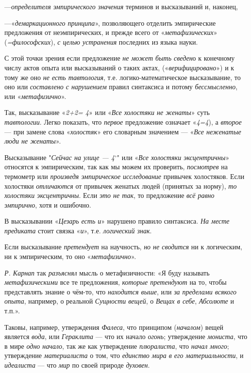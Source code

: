 \documentclass[a4paper,14pt,russian]{extreport}
\begin{document}
---\emph{определителя эмпирического значения} терминов и высказываний и, наконец,

---«\emph{демаркационного принципа}», позволяющего отделить эмпирические предложения от неэмпирических, и прежде всего от «\emph{метафизических}» (\emph{=философских}), \emph{с целью устранения} последних из языка науки.

С этой точки зрения если предложение \emph{не может быть сведен}о к конечному числу актов опыта или высказываний о таких актах, («\emph{верифицировано}») и к тому же оно \emph{не есть тавтология}, т.е. логико-математическое высказывание, то оно или \emph{составлено с нарушением} правил синтаксиса и потому \emph{бессмысленно}, или «\emph{метафизично}».

Так, высказывание «\emph{2+2= 4}» или «\emph{Все холостяки не женаты}» суть \emph{тавтологии}. Легко показать, что \emph{первое} предложение означает «\emph{4=4}), а \emph{второе} --- при замене слова «\emph{холостяк}» его словарным значением --- «\emph{Все неженатые люди не женаты}».

Высказывание "\emph{Сейчас на улице --- 4}$^{\circ}$" или «\emph{Все холостяки эксцентричны}» относятся к эмпирическим, так как мы можем их проверить, \emph{посмотрев} на термометр или \emph{произведя эмпирическое исследование} привычек холостяков. Если холостяки \emph{отличаются} от привычек женатых людей (принятых за норму), \emph{то холостяки эксцентричны}. Если \emph{это не так}, то предложение \emph{всё равно эмпирично}, хотя и ошибочно.

В высказывании «\emph{Цезарь есть и}» нарушено правило синтаксиса. \emph{На месте предиката} стоит связка «\emph{и}», т.е. \emph{логический знак}.

Если высказывание \emph{претендует} на научность, \emph{но не сводится} ни к логическим, ни к эмпирическим, то оно «\emph{метафизично}».

\emph{Р. Карнап} так \emph{разъяснял} мысль о метафизичности: «Я буду называть \emph{метафизическими} все те предложения, \emph{которые претендуют} на то, чтобы представлять знание о чём-то, что \emph{находится выше}, или \emph{за пределами всякого опыта}, например, о реальной \emph{Сущности вещей}, о \emph{Вещах в себе}, \emph{Абсолюте} и т.п.».

Таковы, например, утверждения \emph{Фалеса}, что принципом (\emph{началом}) вещей является \emph{вода}, или \emph{Гераклита} --- что их начало \emph{огонь}; утверждение \emph{мониста}, что в мире \emph{одно начало}, так же как утверждение \emph{плюралиста}, что \emph{начал много}; утверждение \emph{материалиста} о том, что \emph{единство мира в его материальности}, и \emph{идеалиста} --- что \emph{мир} по своей природе \emph{духовен}.
\end{document}
